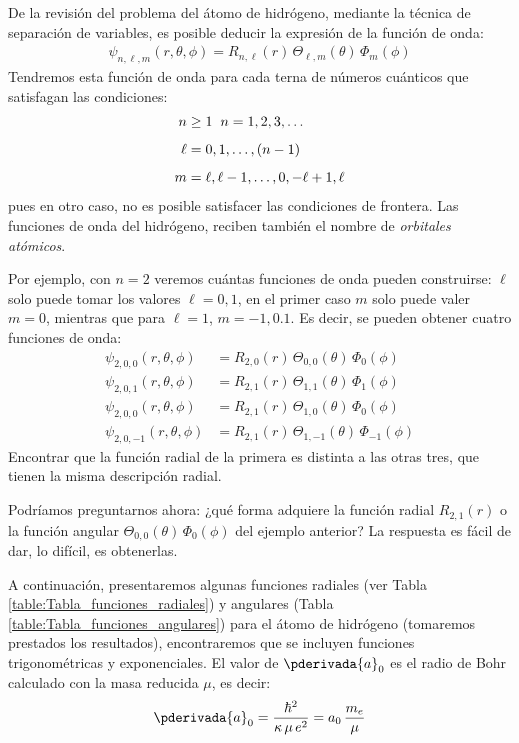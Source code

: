 De la revisión del problema del átomo de hidrógeno, mediante la técnica de separación de variables, es posible deducir la expresión de la función de onda:
\begin{align}
\psi_{n, \ell, m} (r, \theta, \phi) = R _{n, \ell} (r) \, \Theta_{\ell, m} (\theta) \, \Phi_{m} (\phi)
\label{ec:ecuacion_07_25}
\end{align}
Tendremos esta función de onda para cada terna de números cuánticos que satisfagan las condiciones:
\begin{align}
\begin{aligned}
n &\geq 1 \hspace{0.2cm} n = 1, 2, 3, \ldots \\[0.5em]
\ell &= 0, 1, \ldots, (n - 1) \\[0.5em]
m &= \ell, \ell - 1, \ldots, 0, - \ell + 1, \ell
\end{aligned}
\label{eq:ecuacion_07_26}
\end{align}
pues en otro caso, no es posible satisfacer las condiciones de frontera. Las funciones de onda del hidrógeno, reciben también el nombre de \emph{orbitales atómicos}.
\par
Por ejemplo, con $n = 2$ veremos cuántas funciones de onda pueden construirse: $\ell$ solo puede tomar los valores $\ell = 0, 1$, en el primer caso $m$ solo puede valer $m = 0$, mientras que para $\ell = 1$, $m = -1, 0. 1$. Es decir, se pueden obtener cuatro funciones de onda:
\begin{align*}
\psi_{2, 0, 0} (r, \theta, \phi) &= R_{2, 0} (r) \, \Theta_{0, 0} (\theta) \, \Phi_{0} (\phi) \\[0.5em]
\psi_{2, 0, 1} (r, \theta, \phi) &= R_{2, 1} (r) \, \Theta_{1, 1} (\theta) \, \Phi_{1} (\phi) \\[0.5em]
\psi_{2, 0, 0} (r, \theta, \phi) &= R_{2, 1} (r) \, \Theta_{1, 0} (\theta) \, \Phi_{0} (\phi) \\[0.5em]
\psi_{2, 0, -1} (r, \theta, \phi) &= R_{2, 1} (r) \, \Theta_{1, -1} (\theta) \, \Phi_{-1} (\phi)
\end{align*}
Encontrar que la función radial de la primera es distinta a las otras tres, que tienen la misma descripción radial.
\par
Podríamos preguntarnos ahora: ¿qué forma adquiere la función radial $R_{2, 1} (r)$ o la función angular $\Theta_{0, 0} (\theta) \, \Phi_{0} (\phi)$ del ejemplo anterior? La respuesta es fácil de dar, lo difícil, es obtenerlas.
\par
A continuación, presentaremos algunas funciones radiales (ver Tabla \ref{table:Tabla_funciones_radiales}) y angulares (Tabla \ref{table:Tabla_funciones_angulares}) para el átomo de hidrógeno (tomaremos prestados los resultados), encontraremos que se incluyen funciones trigonométricas y exponenciales. El valor de $\pderivada{a}_{0}$ es el radio de Bohr calculado con la masa reducida $\mu$, es decir:
\begin{align}
\pderivada{a}_{0} = \dfrac{\hbar^{2}}{\kappa \, \mu \, e^{2}} = a_{0} \, \dfrac{m_{e}}{\mu}
\label{eq:ecuacion_07_27}
\end{align}

